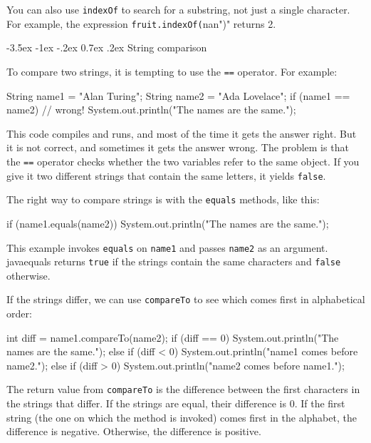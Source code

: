 \documentclass[12pt]{book}
\makeatletter
\theoremstyle{exercise}
\newcommand{\java}[1]{\verb"#1"}
\renewcommand{\section}{\@startsection{section}{1}{\z@}%
    {-3.5ex \@plus -1ex \@minus -.2ex}%
    {0.7ex \@plus.2ex}%
    {\normalfont\Large\bfseries}}
\newcommand{\java}[1]{\lstinline{#1}} %
\makeatother
\begin{document}
You can also use \java{indexOf} to search for a substring, not just a single character.
For example, the expression \java{fruit.indexOf("nan")} returns 2.


\section{String comparison}


To compare two strings, it is tempting to use the \java{==} operator.
For example:

\begin{code}
    String name1 = "Alan Turing";
    String name2 = "Ada Lovelace";
    if (name1 == name2) {                 // wrong!
        System.out.println("The names are the same.");
    }
\end{code}

This code compiles and runs, and most of the time it gets the answer right.
But it is not correct, and sometimes it gets the answer wrong.
The problem is that the \java{==} operator checks whether the two variables refer to the same object.
If you give it two different strings that contain the same letters, it yields \java{false}.

The right way to compare strings is with the \java{equals} methods, like this:

\begin{code}
    if (name1.equals(name2)) {
        System.out.println("The names are the same.");
    }
\end{code}

This example invokes \java{equals} on \java{name1} and passes \java{name2} as an argument.
java{equals} returns \java{true} if the strings contain the same characters and \java{false} otherwise.

If the strings differ, we can use \java{compareTo} to see which comes first in alphabetical order:

\begin{code}
    int diff = name1.compareTo(name2);
    if (diff == 0) {
        System.out.println("The names are the same.");
    } else if (diff < 0) {
        System.out.println("name1 comes before name2.");
    } else if (diff > 0) {
        System.out.println("name2 comes before name1.");
    }
\end{code}

The return value from \java{compareTo} is the difference between the first characters in the strings that differ.
If the strings are equal, their difference is 0.
If the first string (the one on which the method is invoked) comes first in the alphabet, the difference is negative.
Otherwise, the difference is positive.
\end{document}
